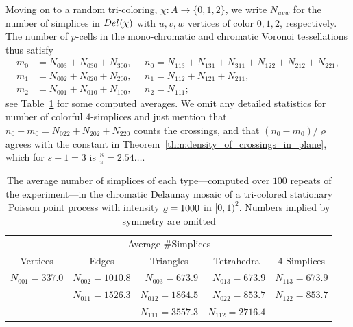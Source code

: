 \documentclass[a4paper]{article}
\newcommand {\mm}[1]   {\ifmmode{#1}\else{\mbox{\(#1\)}}\fi}
\newcommand{\Delaunay}[2]   {\mm{{\rm Del}_{#1}{({#2})}}}
\newcommand{\intensity}     {\mm{\varrho}}
\newcommand{\Skip}[1]       {}
\theoremstyle{definition}
\numberwithin{theorem}{section}
\numberwithin{equation}{section}
\begin{document}
\medskip
Moving on to a random tri-coloring, $\chi \colon A \to \{0,1,2\}$, we write $N_{uvw}$ for the number of simplices in $\Delaunay{}{\chi}$ with $u,v,w$ vertices of color $0,1,2$, respectively.
The number of $p$-cells in the mono-chromatic and chromatic Voronoi tessellations thus satisfy
\begin{align}
  m_0  &=  N_{003} + N_{030} + N_{300} ,  ~~~~~~n_0  =  N_{113} + N_{131} + N_{311} + N_{122} + N_{212} + N_{221}, 
    \label{eqn:m0n0s3d2} \\
  m_1  &=  N_{002} + N_{020} + N_{200} ,  ~~~~~~n_1  =  N_{112} + N_{121} + N_{211} , 
    \label{eqn:m1n1s3d2} \\
  m_2  &=  N_{001} + N_{010} + N_{100} ,  ~~~~~~n_2  =  N_{111} ;
    \label{eqn:mpnp_d2_s2}
\end{align}
see Table~\ref{tbl:simplices_d2_s2} for some computed averages.
We omit any detailed statistics for number of colorful $4$-simplices and just mention that $n_0 - m_0 = N_{022} + N_{202} + N_{220}$ counts the crossings, and that $(n_0 - m_0) / \varrho$ agrees with the constant in Theorem~\ref{thm:density_of_crossings_in_plane}, which for $s+1 = 3$ is $\frac{8}{\pi} = 2.54\ldots$.
\begin{table}[hbt]
    \centering
    \begin{tabular}{rrrrr}
      \multicolumn{5}{c}{Average \#Simplices} \\
      \multicolumn{1}{c}{Vertices} & \multicolumn{1}{c}{Edges} & \multicolumn{1}{c}{Triangles} & \multicolumn{1}{c}{Tetrahedra} & \multicolumn{1}{c}{4-Simplices} \\
      \hline
       $N_{001} = 337.0$ & $N_{002} = 1010.8$ & $N_{003} = 673.9$ & $N_{013} = 673.9$ & $N_{113} = 673.9$ \\
                         & $N_{011} = 1526.3$ & $N_{012} = 1864.5$ & $N_{022} = 853.7$ & $N_{122} = 853.7$ \\
                         &                   & $N_{111} = 3557.3$ & $N_{112} = 2716.4$ & 
    \end{tabular}
    \caption{The average number of simplices of each type---computed over $100$ repeats of the experiment---in the chromatic Delaunay mosaic of a tri-colored stationary Poisson point process with intensity $\intensity = 1000$ in $[0,1)^2$.
    Numbers implied by symmetry are omitted \Skip{The counts didn't really got better without perturbation, I guess the software doesn't handle all the non-perturbed cases well. For example, for $N_{002}$ the count ranges from 9535 to 22572 for 100 iterations.}}
    \label{tbl:simplices_d2_s2}
\end{table}
\end{document}
